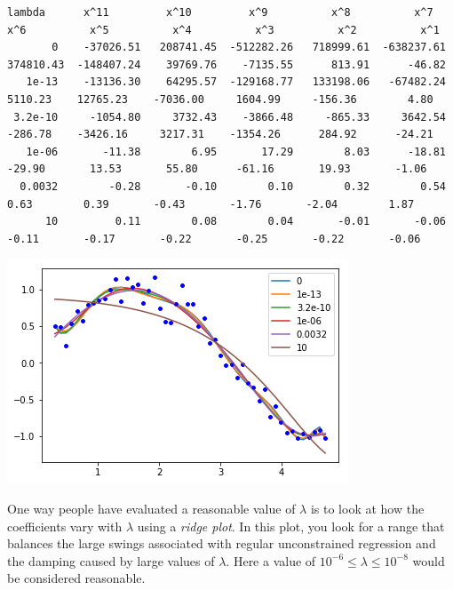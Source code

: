 \documentclass[11pt]{article}
\begin{document}
\begin{verbatim}
lambda      x^11         x^10         x^9          x^8          x^7          x^6          x^5          x^4          x^3          x^2          x^1
       0    -37026.51   208741.45  -512282.26   718999.61  -638237.61   374810.43  -148407.24    39769.76    -7135.55      813.91      -46.82
   1e-13    -13136.30    64295.57  -129168.77   133198.06   -67482.24     5110.23    12765.23    -7036.00     1604.99     -156.36        4.80
 3.2e-10     -1054.80     3732.43    -3866.48     -865.33     3642.54     -286.78    -3426.16     3217.31    -1354.26      284.92      -24.21
   1e-06       -11.38        6.95       17.29        8.03      -18.81      -29.90       13.53       55.80      -61.16       19.93       -1.06
  0.0032        -0.28       -0.10        0.10        0.32        0.54        0.63        0.39       -0.43       -1.76       -2.04        1.87
      10         0.11        0.08        0.04       -0.01       -0.06       -0.11       -0.17       -0.22       -0.25       -0.22       -0.06

\end{verbatim}




\begin{center}
\includegraphics[width=.9\linewidth]{obipy-resources/d00b1703e45a1bb2f86b06f32bba01b8-19673dmv.png}
\end{center}

One way people have evaluated a reasonable value of \(\lambda\) is to look at how the coefficients vary with \(\lambda\) using a \emph{ridge plot}. In this plot, you look for a range that balances the large swings associated with regular unconstrained regression and the damping caused by large values of \(\lambda\). Here a value of \(10^{-6} \le \lambda \le 10^{-8}\) would be considered reasonable.
\end{document}
